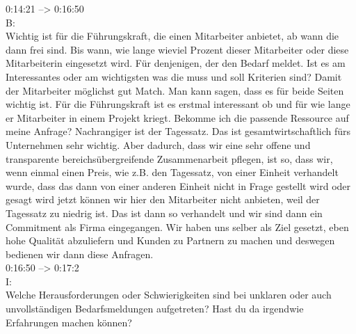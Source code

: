 0:14:21 --> 0:16:50\\
B:\\
Wichtig ist für die Führungskraft, die einen Mitarbeiter anbietet, ab wann die dann frei sind. Bis wann, wie lange wieviel Prozent dieser Mitarbeiter oder diese Mitarbeiterin eingesetzt wird. Für denjenigen, der den Bedarf meldet. Ist es am Interessantes oder am wichtigsten was die muss und soll Kriterien sind? Damit der Mitarbeiter möglichst gut Match. Man kann sagen, dass es für beide Seiten wichtig ist. Für die Führungskraft ist es erstmal interessant ob und für wie lange er Mitarbeiter in einem Projekt kriegt. Bekomme ich die passende Ressource auf meine Anfrage? Nachrangiger ist der Tagessatz. Das ist gesamtwirtschaftlich fürs Unternehmen sehr wichtig. Aber dadurch, dass wir eine sehr offene und transparente bereichsübergreifende Zusammenarbeit pflegen, ist so, dass wir, wenn einmal einen Preis, wie z.B. den Tagessatz, von einer Einheit verhandelt wurde, dass das dann von einer anderen Einheit nicht in Frage gestellt wird oder gesagt wird jetzt können wir hier den Mitarbeiter nicht anbieten, weil der Tagessatz zu niedrig ist. Das ist dann so verhandelt und wir sind dann ein Commitment als Firma eingegangen. Wir haben uns selber als Ziel gesetzt, eben hohe Qualität abzuliefern und Kunden zu Partnern zu machen und deswegen bedienen wir dann diese Anfragen.\\

0:16:50 --> 0:17:2\\
I:\\
Welche Herausforderungen oder Schwierigkeiten sind bei unklaren oder auch unvollständigen Bedarfsmeldungen aufgetreten? Hast du da irgendwie Erfahrungen machen können?\\

